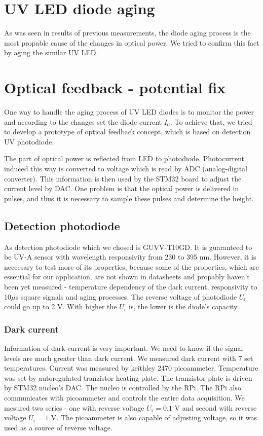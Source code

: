 \section{UV LED diode aging}
As was seen in results of previous measurements, the diode aging process is the most propable cause of the changes in optical power. We tried to confirm this fact by aging the similar UV LED. 
\section{Optical feedback - potential fix}
One way to handle the aging process of UV LED diodes is to monitor the power and according to the changes set the diode current $I_\textrm{d}$. To achieve that, we tried to develop a prototype of optical feedback concept, which is based on detection UV photodiode. 
\par
The part of optical power is reflected from LED to photodiode. Photocurrent induced this way is converted to voltage which is read by ADC (analog-digital converter). This information is then used by the STM32 board to adjust the current level by DAC. One problem is that the optical power is delivered in pulses, and thus it is necessary to sample these pulses and determine the height.
\par
\subsection{Detection photodiode}
As detection photodiode which we chosed is GUVV-T10GD. It is guaranteed to be UV-A sensor with wavelength responsivity from 230 to 395 nm. However, it is neccesary to test more of its properties, because some of the properties, which are essential for our application, are not shown in datasheets and propably haven't been yet measured - temperature dependency of the dark current, responsivity to 10$\mu$s square signals and aging processes. The reverse voltage of photodiode $U_\textrm{r}$ could go up to 2 V. With higher the $U_\textrm{r}$ is, the lower is the diode's capacity.
\par
\subsubsection{Dark current}
Information of dark current is very important. We need to know if the signal levels are much greater than dark current. We measured dark current with 7 set temperatures. Current was measured by keithley 2470 picoammeter. Temperature was set by autoregulated tranzistor heating plate. The tranzistor plate is driven by STM32 nucleo's DAC. The nucleo is controlled by the RPi. The RPi also communicates with picoammeter and controls the entire data acquisition. We mesured two series - one with reverse voltage $U_\textrm{r} = 0.1$ V and second with reverse voltage $U_\textrm{r} = 1$ V. The picoammeter is also capable of adjusting voltage, so it was used as a source of reverse voltage.


